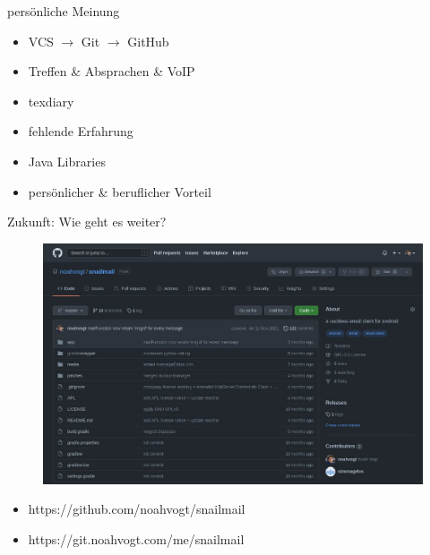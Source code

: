 \documentclass[aspectratio=169]{beamer}
\begin{document}
\begin{frame}[plain]{persönliche Meinung}
\begin{varwidth}{.4\textwidth}
        \begin{itemize}\pause
            \item VCS $\rightarrow$ Git $\rightarrow$ GitHub\pause
            \item Treffen \& Absprachen \& VoIP\pause
            \item texdiary
        \end{itemize}
    \end{varwidth}
    \hfill
    \begin{varwidth}{.4\textwidth}
        \begin{itemize}\pause
            \item fehlende Erfahrung\pause
            \item Java Libraries\pause
            \item persönlicher \& beruflicher Vorteil
        \end{itemize}
    \end{varwidth} 
\end{frame}

\begin{frame}[plain]{Zukunft: Wie geht es weiter?}
    \begin{figure}
        \centering
        \includegraphics[height=.7\textheight]{media/github-repo.jpg}
    \end{figure}
    \begin{itemize}
        \centering
        \item https://github.com/noahvogt/snailmail
        \item https://git.noahvogt.com/me/snailmail
    \end{itemize}
\end{frame}
\end{document}
